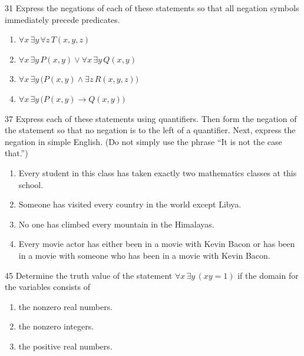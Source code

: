 \documentclass[11pt]{article}
\begin{document}
\begin{exercise}{31}
    Express the negations of each of these statements so that all
    negation symbols immediately precede predicates.
    \begin{enumerate}[label=(\alph*)]
        \item $\forall x\,\exists y\,\forall z\,T(x,y,z)$
        \item $\forall x\,\exists y\,P(x,y)\vee\forall x\,\exists y\,Q(x,y)$
        \item $\forall x\,\exists y\,\big(P(x,y)\wedge\exists z\,R(x,y,z)\big)$
        \item $\forall x\,\exists y\,\big(P(x,y)\to Q(x,y)\big)$
    \end{enumerate}
\end{exercise}

\begin{exercise}{37}
    Express each of these statements using quantifiers. Then form the
    negation of the statement so that no negation is to the left of a
    quantifier. Next, express the negation in simple English. (Do not
    simply use the phrase ``It is not the case that.'')
    \begin{enumerate}[label=(\alph*)]
        \item Every student in this class has taken exactly two mathematics classes at this school.
        \item Someone has visited every country in the world except Libya.
        \item No one has climbed every mountain in the Himalayas.
        \item Every movie actor has either been in a movie with Kevin Bacon or has been in a movie with someone who has been in a movie with Kevin Bacon.
    \end{enumerate}
\end{exercise}

\begin{exercise}{45}
    Determine the truth value of the statement $\forall x\,\exists y\,(xy=1)$
    if the domain for the variables consists of
    \begin{enumerate}[label=(\alph*)]
        \item the nonzero real numbers.
        \item the nonzero integers.
        \item the positive real numbers.
    \end{enumerate}
\end{exercise}
\end{document}
